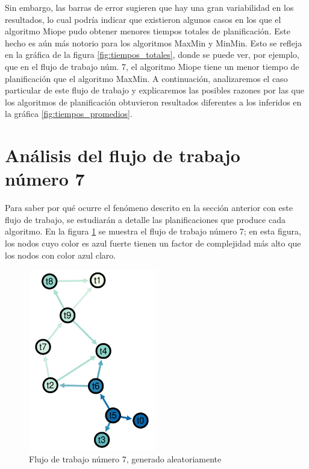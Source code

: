 Sin embargo, las barras de error sugieren que hay una gran variabilidad en los resultados, lo cual podría indicar que existieron algunos casos en los que el algoritmo Miope pudo obtener menores tiempos totales de planificación. Este hecho es aún más notorio para los algoritmos MaxMin y MinMin. Esto se refleja en la gráfica de la figura \ref{fig:tiempos_totales}, donde se puede ver, por ejemplo, que en el flujo de trabajo núm. 7, el algoritmo Miope tiene un menor tiempo de planificación que el algoritmo MaxMin. A continuación, analizaremos el caso particular de este flujo de trabajo y explicaremos las posibles razones por las que los algoritmos de planificación obtuvieron resultados diferentes a los inferidos en la gráfica \ref{fig:tiempos_promedios}.

\section{Análisis del flujo de trabajo número 7}
Para saber por qué ocurre el fenómeno descrito en la sección anterior con este flujo de trabajo, se estudiarán a detalle las planificaciones que produce cada algoritmo. En la figura \ref{fig:workflow6} se muestra el flujo de trabajo número 7; en esta figura, los nodos cuyo color es azul fuerte tienen un factor de complejidad más alto que los nodos con color azul claro.

\begin{figure}
\begin{center}
\includegraphics[width=0.5\textwidth]{imagenes/workflow6.pdf}
\end{center}
\caption{Flujo de trabajo número 7, generado aleatoriamente}
\label{fig:workflow6}
\end{figure}

